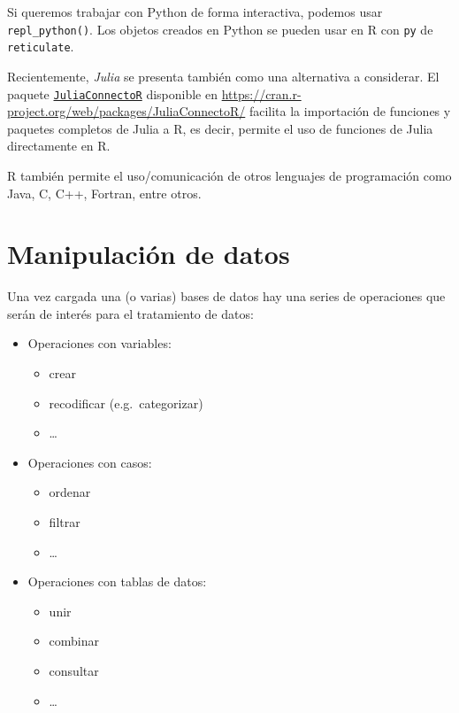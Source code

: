 \documentclass[
]{book}
\providecommand{\tightlist}{%
  \setlength{\itemsep}{0pt}\setlength{\parskip}{0pt}}
\begin{document}
Si queremos trabajar con Python de forma interactiva, podemos usar \texttt{repl\_python()}. Los objetos creados en Python se pueden usar en R con \texttt{py} de \texttt{reticulate}.

Recientemente, \emph{Julia} se presenta también como una alternativa a considerar.
El paquete \href{NA}{\texttt{JuliaConnectoR}} disponible en \url{https://cran.r-project.org/web/packages/JuliaConnectoR/} facilita la importación de funciones y paquetes completos de Julia a R, es decir, permite el uso de funciones de Julia directamente en R.

R también permite el uso/comunicación de otros lenguajes de programación como Java, C, C++, Fortran, entre otros.

\hypertarget{manipulaciuxf3n-de-datos}{%
\section{Manipulación de datos}\label{manipulaciuxf3n-de-datos}}

Una vez cargada una (o varias) bases de datos hay una series de operaciones que serán de interés para el tratamiento de datos:

\begin{itemize}
\tightlist
\item
  Operaciones con variables:

  \begin{itemize}
  \tightlist
  \item
    crear
  \item
    recodificar (e.g.~categorizar)
  \item
    \ldots{}
  \end{itemize}
\item
  Operaciones con casos:

  \begin{itemize}
  \tightlist
  \item
    ordenar
  \item
    filtrar
  \item
    \ldots{}
  \end{itemize}
\item
  Operaciones con tablas de datos:

  \begin{itemize}
  \tightlist
  \item
    unir
  \item
    combinar
  \item
    consultar
  \item
    \ldots{}
  \end{itemize}
\end{itemize}
\end{document}
